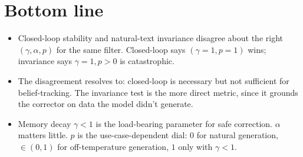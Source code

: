 \documentclass[11pt]{article}
\begin{document}
\section{Bottom line}

\begin{itemize}
\item Closed-loop stability and natural-text invariance disagree about
the right $(\gamma, \alpha, p)$ for the same filter. Closed-loop says
$(\gamma=1, p=1)$ wins; invariance says $\gamma=1, p > 0$ is
catastrophic.
\item The disagreement resolves to: closed-loop is necessary but not
sufficient for belief-tracking. The invariance test is the more direct
metric, since it grounds the corrector on data the model didn't generate.
\item Memory decay $\gamma < 1$ is the load-bearing parameter for safe
correction. $\alpha$ matters little. $p$ is the use-case-dependent dial:
$0$ for natural generation, $\in (0, 1)$ for off-temperature generation,
$1$ only with $\gamma < 1$.
\end{itemize}
\end{document}
